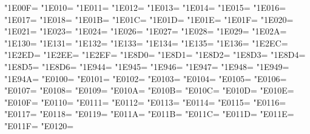 \XeTeXcharclass"1E00F=\KclassCM
\XeTeXcharclass"1E010=\KclassCM
\XeTeXcharclass"1E011=\KclassCM
\XeTeXcharclass"1E012=\KclassCM
\XeTeXcharclass"1E013=\KclassCM
\XeTeXcharclass"1E014=\KclassCM
\XeTeXcharclass"1E015=\KclassCM
\XeTeXcharclass"1E016=\KclassCM
\XeTeXcharclass"1E017=\KclassCM
\XeTeXcharclass"1E018=\KclassCM
\XeTeXcharclass"1E01B=\KclassCM
\XeTeXcharclass"1E01C=\KclassCM
\XeTeXcharclass"1E01D=\KclassCM
\XeTeXcharclass"1E01E=\KclassCM
\XeTeXcharclass"1E01F=\KclassCM
\XeTeXcharclass"1E020=\KclassCM
\XeTeXcharclass"1E021=\KclassCM
\XeTeXcharclass"1E023=\KclassCM
\XeTeXcharclass"1E024=\KclassCM
\XeTeXcharclass"1E026=\KclassCM
\XeTeXcharclass"1E027=\KclassCM
\XeTeXcharclass"1E028=\KclassCM
\XeTeXcharclass"1E029=\KclassCM
\XeTeXcharclass"1E02A=\KclassCM
\XeTeXcharclass"1E130=\KclassCM
\XeTeXcharclass"1E131=\KclassCM
\XeTeXcharclass"1E132=\KclassCM
\XeTeXcharclass"1E133=\KclassCM
\XeTeXcharclass"1E134=\KclassCM
\XeTeXcharclass"1E135=\KclassCM
\XeTeXcharclass"1E136=\KclassCM
\XeTeXcharclass"1E2EC=\KclassCM
\XeTeXcharclass"1E2ED=\KclassCM
\XeTeXcharclass"1E2EE=\KclassCM
\XeTeXcharclass"1E2EF=\KclassCM
\XeTeXcharclass"1E8D0=\KclassCM
\XeTeXcharclass"1E8D1=\KclassCM
\XeTeXcharclass"1E8D2=\KclassCM
\XeTeXcharclass"1E8D3=\KclassCM
\XeTeXcharclass"1E8D4=\KclassCM
\XeTeXcharclass"1E8D5=\KclassCM
\XeTeXcharclass"1E8D6=\KclassCM
\XeTeXcharclass"1E944=\KclassCM
\XeTeXcharclass"1E945=\KclassCM
\XeTeXcharclass"1E946=\KclassCM
\XeTeXcharclass"1E947=\KclassCM
\XeTeXcharclass"1E948=\KclassCM
\XeTeXcharclass"1E949=\KclassCM
\XeTeXcharclass"1E94A=\KclassCM
\XeTeXcharclass"E0100=\KclassCM
\XeTeXcharclass"E0101=\KclassCM
\XeTeXcharclass"E0102=\KclassCM
\XeTeXcharclass"E0103=\KclassCM
\XeTeXcharclass"E0104=\KclassCM
\XeTeXcharclass"E0105=\KclassCM
\XeTeXcharclass"E0106=\KclassCM
\XeTeXcharclass"E0107=\KclassCM
\XeTeXcharclass"E0108=\KclassCM
\XeTeXcharclass"E0109=\KclassCM
\XeTeXcharclass"E010A=\KclassCM
\XeTeXcharclass"E010B=\KclassCM
\XeTeXcharclass"E010C=\KclassCM
\XeTeXcharclass"E010D=\KclassCM
\XeTeXcharclass"E010E=\KclassCM
\XeTeXcharclass"E010F=\KclassCM
\XeTeXcharclass"E0110=\KclassCM
\XeTeXcharclass"E0111=\KclassCM
\XeTeXcharclass"E0112=\KclassCM
\XeTeXcharclass"E0113=\KclassCM
\XeTeXcharclass"E0114=\KclassCM
\XeTeXcharclass"E0115=\KclassCM
\XeTeXcharclass"E0116=\KclassCM
\XeTeXcharclass"E0117=\KclassCM
\XeTeXcharclass"E0118=\KclassCM
\XeTeXcharclass"E0119=\KclassCM
\XeTeXcharclass"E011A=\KclassCM
\XeTeXcharclass"E011B=\KclassCM
\XeTeXcharclass"E011C=\KclassCM
\XeTeXcharclass"E011D=\KclassCM
\XeTeXcharclass"E011E=\KclassCM
\XeTeXcharclass"E011F=\KclassCM
\XeTeXcharclass"E0120=\KclassCM
